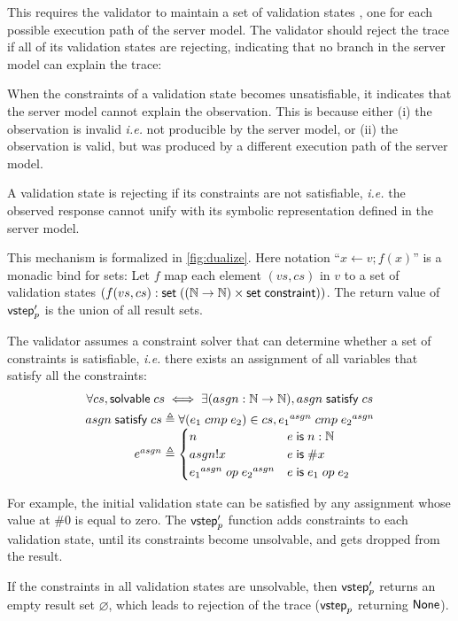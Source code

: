 This
requires the validator to maintain a set of validation states , one for each
possible execution path of the server model.  The validator should reject the
trace if all of its validation states are rejecting, indicating that no branch
in the server model can explain the trace:


When the constraints of a validation state becomes unsatisfiable, it indicates
that the server model cannot explain the observation.  This is because either
(i) the observation is invalid {\it i.e.} not producible by the server model, or
(ii) the observation is valid, but was produced by a different execution path of
the server model.


A validation state is rejecting if its constraints are not satisfiable, {\it
  i.e.} the observed response cannot unify with its symbolic representation
defined in the server model.


This mechanism is formalized in \autoref{fig:dualize}.  Here notation ``$x\gets
v;f(x)$'' is a monadic bind for sets: Let $f$ map each element $(vs,cs)$ in $v$
to a set of validation states
$(f(vs,cs):\mathsf{set}\;((\mathbb N\to\mathbb N)\times\mathsf{set}\;\mathsf{constraint}))$.  The return value of
$\mathsf{vstep}_p'$ is the union of all result sets.

The validator assumes a constraint solver that can determine whether a set of
constraints is satisfiable, {\it i.e.} there exists an assignment of all
variables that satisfy all the constraints:
\begin{gather*}
  \forall cs,\solvable cs\iff\exists (asgn:\Nat\to\Nat),\satisfy{asgn}cs\\
  \begin{array}{r@{\;}l}
    \satisfy{asgn}cs\triangleq&\forall(e_1\;cmp\;e_2)\in cs, {e_1}^{asgn}\;cmp\;{e_2}^{asgn}\\
    e^{asgn}\triangleq&\begin{cases}
      n&e\Is n:\Nat\\
      asgn!x&e\Is \#x\\
      {e_1}^{asgn}\;op\;{e_2}^{asgn}&e\Is e_1\;op\;e_2
    \end{cases}
  \end{array}
\end{gather*}

For example, the initial validation state can be satisfied by any assignment
whose value at $\#0$ is equal to zero.  The $\mathsf{vstep}_p'$ function adds constraints
to each validation state, until its constraints become unsolvable, and gets
dropped from the result.

If the constraints in all validation states are unsolvable, then $\mathsf{vstep}_p'$
returns an empty result set $\varnothing$, which leads to rejection of the trace
($\mathsf{vstep}_p$ returning $\mathsf{None}$).
